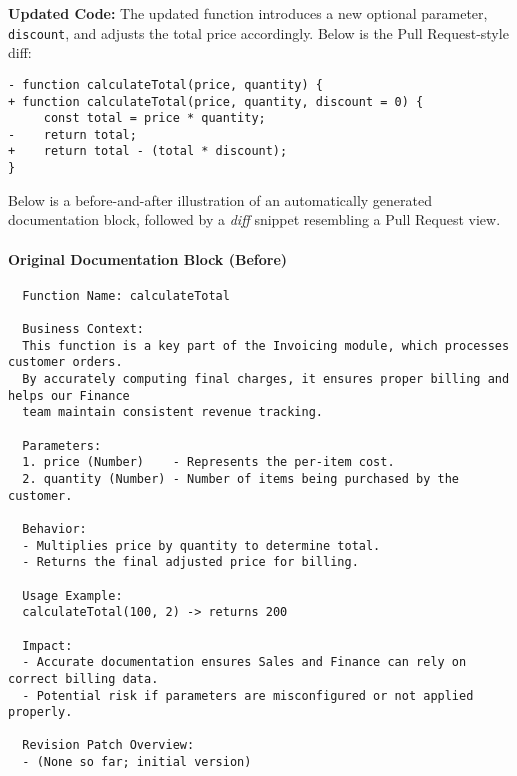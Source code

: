 \documentclass[12pt,oneside]{article}
\begin{document}
\noindent\textbf{Updated Code:}
The updated function introduces a new optional parameter, \texttt{discount}, and adjusts the total price accordingly.
Below is the Pull Request-style diff:

\begin{verbatim}
- function calculateTotal(price, quantity) {
+ function calculateTotal(price, quantity, discount = 0) {
     const total = price * quantity;
-    return total;
+    return total - (total * discount);
}
\end{verbatim}

Below is a before-and-after illustration of an automatically generated documentation block, followed by a \emph{diff} 
snippet resembling a Pull Request view.

\paragraph{Original Documentation Block (Before)}
\begin{verbatim}
  Function Name: calculateTotal
  
  Business Context:
  This function is a key part of the Invoicing module, which processes customer orders.
  By accurately computing final charges, it ensures proper billing and helps our Finance
  team maintain consistent revenue tracking.
  
  Parameters:
  1. price (Number)    - Represents the per-item cost.
  2. quantity (Number) - Number of items being purchased by the customer.
  
  Behavior:
  - Multiplies price by quantity to determine total.
  - Returns the final adjusted price for billing.
  
  Usage Example:
  calculateTotal(100, 2) -> returns 200
  
  Impact:
  - Accurate documentation ensures Sales and Finance can rely on correct billing data.
  - Potential risk if parameters are misconfigured or not applied properly.
  
  Revision Patch Overview:
  - (None so far; initial version)
\end{verbatim}
\end{document}
